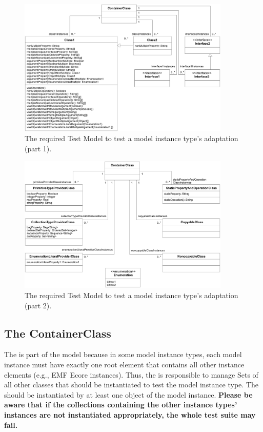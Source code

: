 \begin{figure}
	\includegraphics[width=0.9\textwidth]{figures/modelinstancetestsuite/testModel01.pdf}
	\caption{The required Test Model to test a model instance type's adaptation
	(part 1).}
	\label{pic:modelinstancetestsuite:testModel1}
\end{figure}

\begin{figure}
  \includegraphics[width=0.9\textwidth]{figures/modelinstancetestsuite/testModel02.pdf}
	\caption{The required Test Model to test a model instance type's adaptation
	(part 2).}
	\label{pic:modelinstancetestsuite:testModel2}
\end{figure}


\subsection{The ContainerClass}

The  is part of the model because in some model instance
types, each model instance must have exactly one root element that contains all 
other instance elements (e.g., EMF Ecore instances). Thus, the 
 is responsible to manage Sets of all other classes that 
should be instantiated to test the model instance type. The
 should be instantiated by at least one object of the 
model instance. \textbf{Please be aware that if the collections containing the 
other instance types' instances are not instantiated appropriately, the whole
test suite may fail.}



